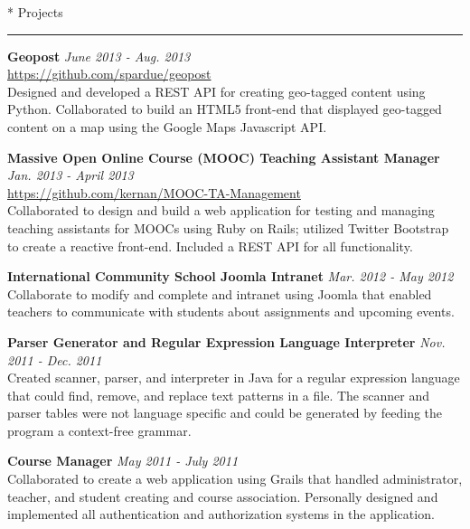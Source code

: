 \documentclass{article}
\makeatletter
\renewcommand{\section}[1]{
	\vspace{0.75em} %
	\@startsection
		{section}
		{1}
		{\z@}
		{0em}
		{1em \@minus 1em} %
		{\normalfont\large\sc\bfseries}
		*
		{#1}
	\vspace{-0.75em} %
	\hrule
	\vspace{0.25em} %
	\par
}
\newcommand{\entry}[1]{\def \@entry {#1}}
\newcommand{\dates}[1]{\def \@dates {#1}}
\newenvironment{datedentry}{
		\vspace{0.5em} %
		{\bf \@entry} \hfill {\it \@dates} \\
	}{}
\makeatother
\begin{document}
\section{Projects}

\entry{Geopost}
\dates{June 2013 - Aug. 2013}
\begin{datedentry}
\url{https://github.com/spardue/geopost} \\
Designed and developed a REST API for creating geo-tagged content using Python.
Collaborated to build an HTML5 front-end that displayed geo-tagged content on a
map using the Google Maps Javascript API.
\end{datedentry}

\entry{Massive Open Online Course (MOOC) Teaching Assistant Manager}
\dates{Jan. 2013 - April 2013}
\begin{datedentry}
\url{https://github.com/kernan/MOOC-TA-Management} \\
Collaborated to design and build a web application for testing and managing
teaching assistants for MOOCs using Ruby on Rails; utilized Twitter Bootstrap to
create a reactive front-end. Included a REST API for all functionality.
\end{datedentry}

\entry{International Community School Joomla Intranet}
\dates{Mar. 2012 - May 2012}
\begin{datedentry}
Collaborate to modify and complete and intranet using Joomla that enabled
teachers to communicate with students about assignments and upcoming events.
\end{datedentry}

\entry{Parser Generator and Regular Expression Language Interpreter}
\dates{Nov. 2011 - Dec. 2011}
\begin{datedentry}
Created scanner, parser, and interpreter in Java for a regular expression
language that could find, remove, and replace text patterns in a file. The
scanner and parser tables were not language specific and could be generated by
feeding the program a context-free grammar.
\end{datedentry}

\entry{Course Manager}
\dates{May 2011 - July 2011}
\begin{datedentry}
Collaborated to create a web application using Grails that handled administrator, teacher, and student creating and course association. Personally designed and implemented all authentication and authorization systems in the application.
\end{datedentry}
\end{document}
